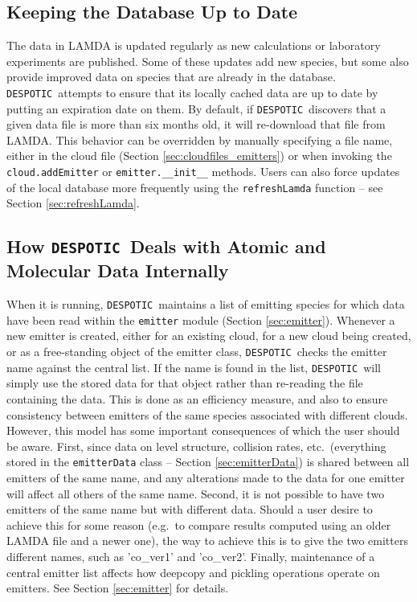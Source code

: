 \documentclass[12pt]{article}
\newcommand{\despotic}{\texttt{DESPOTIC}}
\begin{document}
\subsection{Keeping the Database Up to Date}
\label{sec:database_updates}

The data in LAMDA is updated regularly as new calculations or laboratory experiments are published. Some of these updates add new species, but some also provide improved data on species that are already in the database.  \despotic\ attempts to ensure that its locally cached data are up to date by putting an expiration date on them. By default, if \despotic\ discovers that a given data file is more than six months old, it will re-download that file from LAMDA. This behavior can be overridden by manually specifying a file name, either in the cloud file (Section \ref{sec:cloudfiles_emitters}) or when invoking the \verb=cloud.addEmitter= or \verb=emitter.__init__= methods. Users can also force updates of the local database more frequently using the \verb=refreshLamda= function -- see Section \ref{sec:refreshLamda}.


\subsection{How \despotic\ Deals with Atomic and Molecular Data Internally}

When it is running, \despotic\ maintains a list of emitting species for which data have been read within the \verb=emitter= module (Section \ref{sec:emitter}). Whenever a new emitter is created, either for an existing cloud, for a new cloud being created, or as a free-standing object of the emitter class, \despotic\ checks the emitter name against the central list. If the name is found in the list, \despotic\ will simply use the stored data for that object rather than re-reading the file containing the data. This is done as an efficiency measure, and also to ensure consistency between emitters of the same species associated with different clouds. However, this model has some important consequences of which the user should be aware. First, since data on level structure, collision rates, etc.\ (everything stored in the \verb=emitterData= class -- Section \ref{sec:emitterData}) is shared between all emitters of the same name, and any alterations made to the data for one emitter will affect all others of the same name. Second, it is not possible to have two emitters of the same name but with different data. Should a user desire to achieve this for some reason (e.g.~to compare results computed using an older LAMDA file and a newer one), the way to achieve this is to give the two emitters different names, such as 'co\_ver1' and 'co\_ver2'. Finally, maintenance of a central emitter list affects how deepcopy and pickling operations operate on emitters. See Section \ref{sec:emitter} for details.
\end{document}

